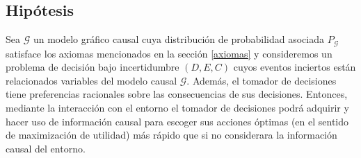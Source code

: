 \documentclass[11pt]{article}
\theoremstyle{plain}
\begin{document}
\subsection{Hipótesis}
Sea $\mathcal{G}$ un modelo gráfico causal cuya distribución de probabilidad asociada $P_\mathcal{G}$ satisface los axiomas mencionados en la sección \ref{axiomas} y consideremos un problema de decisión bajo incertidumbre $(D,E,C)$ cuyos eventos inciertos están relacionados variables del modelo causal $\mathcal{G}$. Además, el tomador de decisiones tiene preferencias racionales sobre las consecuencias de sus decisiones. Entonces, mediante la interacción con el entorno el tomador de decisiones podrá adquirir y hacer uso de información causal para  escoger sus acciones óptimas (en el sentido de maximización de utilidad) más rápido que si no considerara la información causal del entorno.
\end{document}
